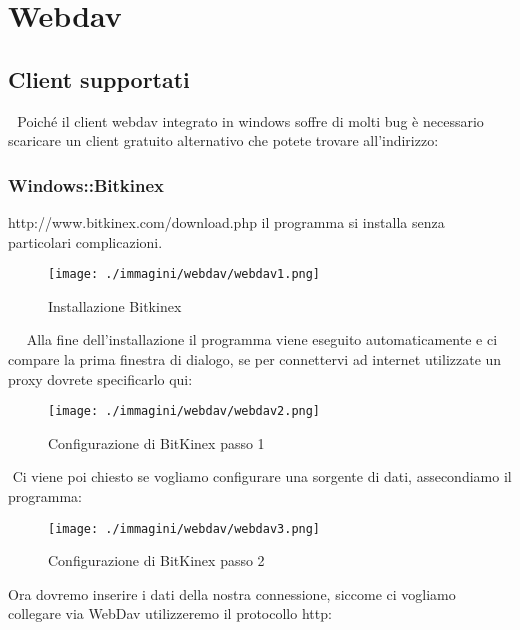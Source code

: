 \chapter{Webdav}

\section{Client supportati}

  Poiché il client webdav integrato in windows soffre di molti bug è necessario scaricare un
client gratuito alternativo che potete trovare all'indirizzo:

\subsection{Windows::Bitkinex}

http://www.bitkinex.com/download.php
il programma si installa senza particolari complicazioni. 

\begin{figure}[H]
 \centering
 \texttt{[image: ./immagini/webdav/webdav1.png]}
\caption{Installazione Bitkinex}\label{fig:BitKinex}
\end{figure}


    Alla fine dell'installazione il programma viene eseguito automaticamente e ci compare la
prima finestra di dialogo, se per connettervi ad internet utilizzate un proxy dovrete
specificarlo qui:

  \begin{figure}[H]
 \centering
 \texttt{[image: ./immagini/webdav/webdav2.png]}
 \caption{Configurazione di BitKinex passo 1}
 \label{fig:bitkinex_1}
\end{figure}


 Ci viene poi chiesto se vogliamo configurare una sorgente di dati, assecondiamo il
programma:
 

\begin{figure}[H]
 \centering
 \texttt{[image: ./immagini/webdav/webdav3.png]}
 \caption{Configurazione di BitKinex passo 2}
 \label{fig:bitkinex2}
\end{figure}


Ora dovremo inserire i dati della nostra connessione, siccome ci vogliamo collegare via
WebDav utilizzeremo il protocollo http:

